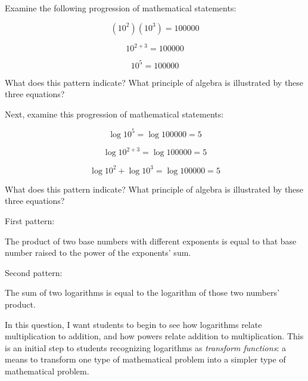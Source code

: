 

Examine the following progression of mathematical statements:

$$(10^2)(10^3) = 100000$$

$$10^{2+3} = 100000$$

$$10^5 = 100000$$

What does this pattern indicate?  What principle of algebra is illustrated by these three equations?

Next, examine this progression of mathematical statements:

$$\log 10^5 = \log 100000 = 5$$

$$\log 10^{2+3} = \log 100000 = 5$$

$$\log 10^2 + \log 10^3 = \log 100000 = 5$$

What does this pattern indicate?  What principle of algebra is illustrated by these three equations?







\noindent
First pattern:

The product of two base numbers with different exponents is equal to that base number raised to the power of the exponents' sum.

\vskip 10pt

\noindent
Second pattern:

The sum of two logarithms is equal to the logarithm of those two numbers' product. 







In this question, I want students to begin to see how logarithms relate multiplication to addition, and how powers relate addition to multiplication.  This is an initial step to students recognizing logarithms as {\it transform functions}: a means to transform one type of mathematical problem into a simpler type of mathematical problem.




